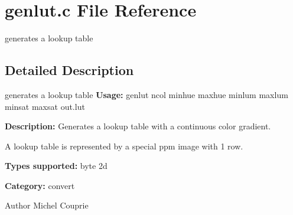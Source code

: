 \section{genlut.c File Reference}
\label{genlut_8c}


generates a lookup table  




\subsection{Detailed Description}
generates a lookup table {\bfseries Usage:} genlut ncol minhue maxhue minlum maxlum minsat maxsat out.lut

{\bfseries Description:} Generates a lookup table with a continuous color gradient.

A lookup table is represented by a special ppm image with 1 row.

{\bfseries Types supported:} byte 2d

{\bfseries Category:} convert

\begin{DoxyAuthor}{Author}
Michel Couprie 
\end{DoxyAuthor}
